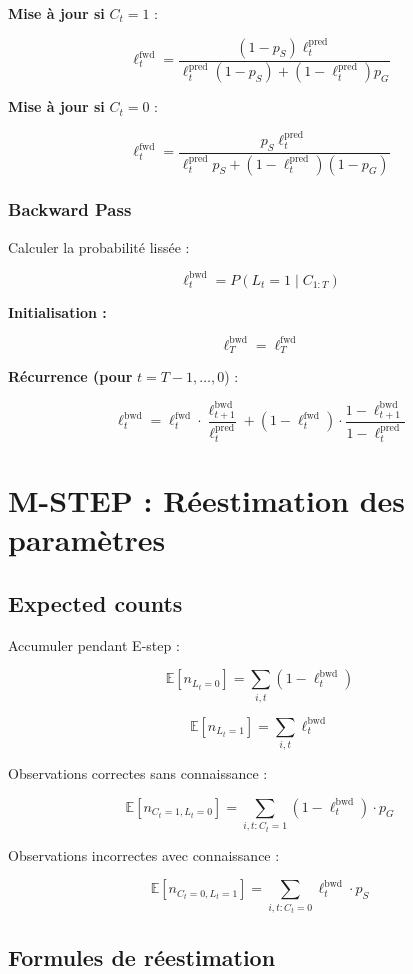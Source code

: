 \documentclass[12pt]{article}
\begin{document}
\textbf{Mise à jour si } $C_t = 1$ :

$$\ell_t^{\text{fwd}} = \frac{(1-p_S) \ell_t^{\text{pred}}}{\ell_t^{\text{pred}}(1-p_S) + (1-\ell_t^{\text{pred}})p_G}$$

\textbf{Mise à jour si } $C_t = 0$ :

$$\ell_t^{\text{fwd}} = \frac{p_S \ell_t^{\text{pred}}}{\ell_t^{\text{pred}} p_S + (1-\ell_t^{\text{pred}})(1-p_G)}$$

\subsubsection{Backward Pass}

Calculer la probabilité lissée :

$$\ell_t^{\text{bwd}} = P(L_t = 1 \mid C_{1:T})$$

\textbf{Initialisation :}

$$\ell_T^{\text{bwd}} = \ell_T^{\text{fwd}}$$

\textbf{Récurrence (pour } $t = T-1, \ldots, 0$) :

$$\ell_t^{\text{bwd}} = \ell_t^{\text{fwd}} \cdot \frac{\ell_{t+1}^{\text{bwd}}}{\ell_t^{\text{pred}}} + (1-\ell_t^{\text{fwd}}) \cdot \frac{1-\ell_{t+1}^{\text{bwd}}}{1-\ell_t^{\text{pred}}}$$

\section{M-STEP : Réestimation des paramètres}

\subsection{Expected counts}

Accumuler pendant E-step :

$$\mathbb{E}[n_{L_t=0}] = \sum_{i,t} (1 - \ell_t^{\text{bwd}})$$

$$\mathbb{E}[n_{L_t=1}] = \sum_{i,t} \ell_t^{\text{bwd}}$$

Observations correctes sans connaissance :

$$\mathbb{E}[n_{C_t=1, L_t=0}] = \sum_{i,t : C_t=1} (1-\ell_t^{\text{bwd}}) \cdot p_G$$

Observations incorrectes avec connaissance :

$$\mathbb{E}[n_{C_t=0, L_t=1}] = \sum_{i,t : C_t=0} \ell_t^{\text{bwd}} \cdot p_S$$

\subsection{Formules de réestimation}
\end{document}
